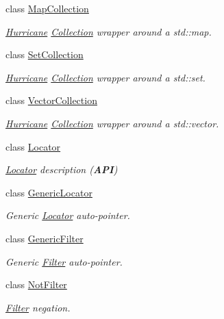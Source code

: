 \begin{DoxyCompactItemize}
class \hyperlink{classHurricane_1_1MapCollection}{Map\-Collection}
\begin{DoxyCompactList}\small\item\em \hyperlink{namespaceHurricane}{Hurricane} \hyperlink{classHurricane_1_1Collection}{Collection} wrapper around a std\-::map. \end{DoxyCompactList}\item 
class \hyperlink{classHurricane_1_1SetCollection}{Set\-Collection}
\begin{DoxyCompactList}\small\item\em \hyperlink{namespaceHurricane}{Hurricane} \hyperlink{classHurricane_1_1Collection}{Collection} wrapper around a std\-::set. \end{DoxyCompactList}\item 
class \hyperlink{classHurricane_1_1VectorCollection}{Vector\-Collection}
\begin{DoxyCompactList}\small\item\em \hyperlink{namespaceHurricane}{Hurricane} \hyperlink{classHurricane_1_1Collection}{Collection} wrapper around a std\-::vector. \end{DoxyCompactList}\item 
class \hyperlink{classHurricane_1_1Locator}{Locator}
\begin{DoxyCompactList}\small\item\em \hyperlink{classHurricane_1_1Locator}{Locator} description ({\bfseries A\-P\-I}) \end{DoxyCompactList}\item 
class \hyperlink{classHurricane_1_1GenericLocator}{Generic\-Locator}
\begin{DoxyCompactList}\small\item\em Generic \hyperlink{classHurricane_1_1Locator}{Locator} auto-\/pointer. \end{DoxyCompactList}\item 
class \hyperlink{classHurricane_1_1GenericFilter}{Generic\-Filter}
\begin{DoxyCompactList}\small\item\em Generic \hyperlink{classHurricane_1_1Filter}{Filter} auto-\/pointer. \end{DoxyCompactList}\item 
class \hyperlink{classHurricane_1_1NotFilter}{Not\-Filter}
\begin{DoxyCompactList}\small\item\em \hyperlink{classHurricane_1_1Filter}{Filter} negation. \end{DoxyCompactList}\item 

\end{DoxyCompactItemize}
